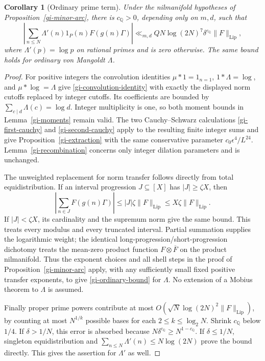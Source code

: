 \documentclass[11pt]{article}
\newtheorem{corollary}[theorem]{Corollary}
\theoremstyle{definition}
\theoremstyle{remark}
\begin{document}
\begin{corollary}[Ordinary prime term]\label{gi-ordinary-primes}
Under the nilmanifold hypotheses of Proposition~\ref{gi-minor-arc},
there is $c_{\mathbb Q}>0$, depending only on $m,d$, such that
\begin{equation}\label{gi-ordinary-bound}
 \left|\sum_{n\leq N}\Lambda'(n)1_P(n)F(g(n)\Gamma)\right|
 \ll_{m,d} QN\log(2N)^7\delta^{c_{\mathbb Q}}\|F\|_{\mathrm{Lip}},
\end{equation}
where $\Lambda'(p)=\log p$ on rational primes and is zero otherwise.
The same bound holds for ordinary von Mangoldt $\Lambda$.
\end{corollary}
\begin{proof}
For positive integers the convolution identities
$\mu*1=1_{n=1}$, $1*\Lambda=\log$, and $\mu*\log=\Lambda$ give
\eqref{gi-convolution-identity} with exactly the displayed norm cutoffs
replaced by integer cutoffs.  Its coefficients are bounded by
$\sum_{c\mid d}\Lambda(c)=\log d$.  Integer multiplicity is one,
so both moment bounds in Lemma~\ref{gi-moments} remain valid.  The
two Cauchy--Schwarz calculations \eqref{gi-first-cauchy} and
\eqref{gi-second-cauchy} apply to the resulting finite integer sums
and give Proposition~\ref{gi-extraction} with the same conservative
parameter $c_0\epsilon^4/L^{24}$.  Lemma~\ref{gi-recombination} concerns
only integer dilation parameters and is unchanged.

The unweighted replacement for norm transfer follows directly from
total equidistribution.  If an interval progression $J\subseteq[X]$
has $|J|\geq\zeta X$, then
\[
 \left|\sum_{n\in J}F(g(n)\Gamma)\right|
       \leq |J|\zeta\|F\|_{\mathrm{Lip}}
       \leq X\zeta\|F\|_{\mathrm{Lip}}.
\]
If $|J|<\zeta X$, its cardinality and the supremum norm give the same
bound.  This treats every modulus and every truncated interval.
Partial summation supplies the logarithmic weight; the identical
long-progression/short-progression dichotomy treats the mean-zero
product function $F\otimes\overline F$ on the product nilmanifold.
Thus the exponent choices and all shell steps in the proof of
Proposition~\ref{gi-minor-arc} apply, with any sufficiently small
fixed positive transfer exponents, to give \eqref{gi-ordinary-bound}
for $\Lambda$.  No extension of a Mobius theorem to $\Lambda$ is assumed.

Finally proper prime powers contribute at most
$O(\sqrt N\log(2N)^2\|F\|_{\mathrm{Lip}})$, by counting at most
$N^{1/k}$ possible bases for each $2\leq k\leq\log_2N$.
Shrink $c_{\mathbb Q}$ below $1/4$.  If $\delta>1/N$, this error is
absorbed because $N\delta^{c_{\mathbb Q}}\geq N^{1-c_{\mathbb Q}}$.
If $\delta\leq1/N$, singleton equidistribution and
$\sum_{n\leq N}\Lambda'(n)\leq N\log(2N)$ prove the bound directly.
This gives the assertion for $\Lambda'$ as well.
\end{proof}
\end{document}
